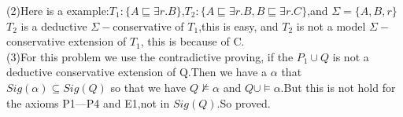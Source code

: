 \documentclass{article}
\begin{document}
    (2)Here is a example:$T_1:\{A\sqsubseteq \exists r.B\}$,$T_2:\{A\sqsubseteq \exists r.B,B\sqsubseteq \exists r.C\}$,and $\Sigma=\{A,B,r\}$\\
    $T_2$ is a deductive $\Sigma-$conservative of $T_1$,this is easy, and $T_2$ is not a model $\Sigma-$conservative extension of $T_1$, this is because of C.\\
    (3)For this problem we use the contradictive proving, if the $P_1 \cup Q$ is not a deductive conservative extension of Q.Then
    we have a $\alpha$ that $Sig(\alpha)\subseteq Sig(Q)$ so that we have $Q \not\models \alpha$ and $Q \cup \models \alpha$.But this is not hold for the axioms \textsf{P1---P4}
    and E1,not in $Sig(Q)$.So proved.\\
\end{document}
